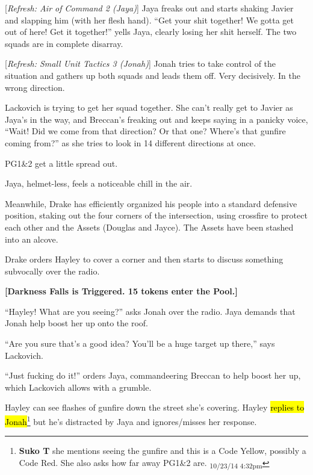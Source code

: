 {[}\textit{Refresh: Air of Command 2 (Jaya)}{]}  Jaya freaks out and starts shaking Javier and slapping him (with her flesh hand).  ``Get your shit together!  We gotta get out of here!   Get it together!'' yells Jaya, clearly losing her shit herself. The two squads are in complete disarray.

{[}\textit{Refresh: Small Unit Tactics 3 (Jonah)}{]}  Jonah tries to take control of the situation and gathers up both squads and leads them off. Very decisively.  In the wrong direction.

Lackovich is trying to get her squad together.  She can't really get to Javier as Jaya's in the way, and Breccan's freaking out and keeps saying in a panicky voice, ``Wait!  Did we come from that direction?  Or that one?  Where's that gunfire coming from?'' as she tries to look in 14 different directions at once.

PG1\&2 get a little spread out.

Jaya, helmet-less, feels a noticeable chill in the air.



Meanwhile, Drake has efficiently organized his people into a standard defensive position, staking out the four corners of the intersection, using crossfire to protect each other and the Assets (Douglas and Jayce).  The Assets have been stashed into an alcove.

Drake orders Hayley to cover a corner and then starts to discuss something subvocally over the radio.



\textbf{{[}Darkness Falls is Triggered.  15 tokens enter the Pool.{]}}



``Hayley! What are you seeing?'' asks Jonah over the radio.  Jaya demands that Jonah help boost her up onto the roof.  

``Are you sure that's a good idea?  You'll be a huge target up there,'' says Lackovich.

``Just fucking do it!'' orders Jaya, commandeering Breccan to help boost her up, which Lackovich allows with a grumble.  



Hayley can see flashes of gunfire down the street she's covering.  Hayley \hl{replies to Jonah}\footnote{\textbf{Suko T }she mentions seeing the gunfire and this is a Code Yellow, possibly a Code Red.  She also asks how far away PG1\&2 are. \textsubscript{10/23/14 4:32pm}} but he's distracted by Jaya and ignores/misses her response.



